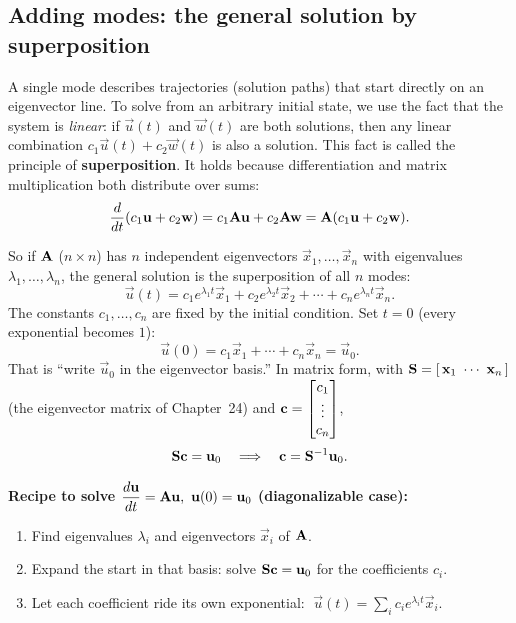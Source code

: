 \subsection{Adding modes: the general solution by superposition}
\label{ch25:superposition}

A single mode describes trajectories (solution paths) that start directly on an eigenvector line.
To solve from an arbitrary initial state, we use the fact that the system is \emph{linear}:
if $\vec{u}(t)$ and $\vec{w}(t)$ are both solutions, then any linear combination
$c_1\vec{u}(t) + c_2\vec{w}(t)$ is also a solution. This fact is called the
principle of \textbf{superposition}.
It holds because differentiation and matrix multiplication both distribute over sums:
\[
  \frac{d}{dt}(c_1\mathbf{u}+c_2\mathbf{w}) = c_1\mathbf{A}\mathbf{u} + c_2\mathbf{A}\mathbf{w} = \mathbf{A}(c_1\mathbf{u}+c_2\mathbf{w}).
\]

So if $\mathbf{A}$ ($n\times n$) has $n$ independent eigenvectors $\vec{x}_1,\dots,
\vec{x}_n$ with eigenvalues $\lambda_1,\dots,\lambda_n$, the general solution is
the superposition of all $n$ modes:
\[
  \boxed{\,
  \vec{u}(t) = c_1 e^{\lambda_1 t}\vec{x}_1
             + c_2 e^{\lambda_2 t}\vec{x}_2
             + \cdots
             + c_n e^{\lambda_n t}\vec{x}_n.
  \,}
\]
The constants $c_1,\dots,c_n$ are fixed by the initial condition. Set $t=0$
(every exponential becomes $1$):
\[
  \vec{u}(0) = c_1\vec{x}_1 + \cdots + c_n\vec{x}_n = \vec{u}_0.
\]
That is ``write $\vec{u}_0$ in the eigenvector basis.'' In matrix form, with
$\mat{S} = [\,\vec{x}_1\ \cdots\ \vec{x}_n\,]$ (the eigenvector matrix of Chapter~24) and $\mathbf{c}=\begin{bmatrix}c_1\\\vdots\\c_n\end{bmatrix}$,
\[
  \mathbf{S}\mathbf{c} = \mathbf{u}_0
  \quad\Longrightarrow\quad
  \mathbf{c} = \mathbf{S}^{-1}\mathbf{u}_0.
\]

\begin{focusbox}
\textbf{Recipe to solve $\dfrac{d\vec{u}}{dt}=\mat{A}\vec{u},\ \vec{u}(0)=\vec{u}_0$
(diagonalizable case):}
\begin{enumerate}
  \item Find eigenvalues $\lambda_i$ and eigenvectors $\vec{x}_i$ of $\mathbf{A}$.
  \item Expand the start in that basis: solve $\mathbf{S}\mathbf{c}=\mathbf{u}_0$ for the
        coefficients $c_i$.
  \item Let each coefficient ride its own exponential:
        $\;\vec{u}(t)=\sum_i c_i e^{\lambda_i t}\vec{x}_i.$
\end{enumerate}
\end{focusbox}

